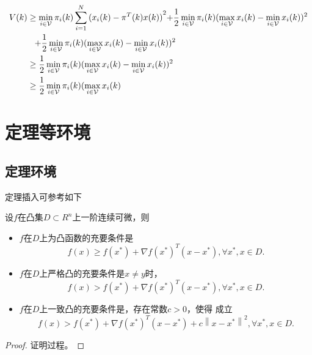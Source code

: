 \documentclass[master]{hdu-thesis}
\begin{document}
\begin{equation}\label{system4}
  \begin{split}
V(k) &\ge \mathop {\min }\limits_{i \in {\cal V}} {\pi _i}(k)\sum\limits_{i = 1}^N {{{({x_i}(k) - {\pi ^T}(k)x(k))}^2}} {\rm{ + }}\frac{1}{2}\mathop {\min }\limits_{i \in {\cal V}} {\pi _i}(k){(\mathop {\max }\limits_{i \in {\cal V}} {x_i}(k) - \mathop {\min }\limits_{i \in {\cal V}} {x_i}(k))^2}\\
&\hspace{0.3cm}{\rm{ + }}\frac{1}{2}\mathop {\min }\limits_{i \in {\cal V}} {\pi _i}(k){(\mathop {\max }\limits_{i \in {\cal V}} {x_i}(k) - \mathop {\min }\limits_{i \in {\cal V}} {x_i}(k))^2}\\
& \ge \frac{1}{2}\mathop {\min }\limits_{i \in {\cal V}} {\pi _i}(k){(\mathop {\max }\limits_{i \in {\cal V}} {x_i}(k) - \mathop {\min }\limits_{i \in {\cal V}} {x_i}(k))^2}\\
 &\ge \frac{1}{2}\mathop {\min }\limits_{i \in {\cal V}} {\pi _i}(k)(\mathop {\max }\limits_{i \in {\cal V}} {x_i}(k)
  \end{split}
\end{equation}


\section{定理等环境}
\subsection{定理环境}

定理插入可参考如下
\begin{theorem}
设$f$在凸集$D \subset {R^n}$上一阶连续可微，则
\begin{itemize}
\item $f$在$D$上为凸函数的充要条件是
\begin{equation*}
f(x) \ge f({x^*}) + \nabla f{({x^*})^T}(x - {x^*}),\forall {x^*},x \in D.
\end{equation*}
\item  $f$在$D$上严格凸的充要条件是$x \ne y$时，
\begin{equation*}
f(x) > f({x^*}) + \nabla f{({x^*})^T}(x - {x^*}),\forall {x^*},x \in D.
\end{equation*}
\item $f$在$D$上一致凸的充要条件是，存在常数$c > 0$，使得
成立
\begin{equation*}
f(x) > f({x^*}) + \nabla f{({x^*})^T}(x - {x^*}) + c{\left\| {x - {x^*}} \right\|^2},\forall {x^*},x \in D.
\end{equation*}
\end{itemize}
\end{theorem}
\begin{proof}
  证明过程。
  \end{proof}
\end{document}
